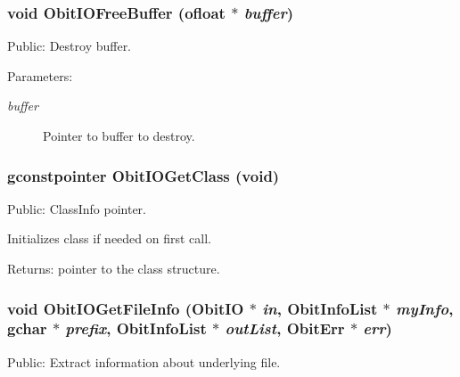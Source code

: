 \subsubsection{\setlength{\rightskip}{0pt plus 5cm}void Obit\-IOFree\-Buffer ({\bf ofloat} $\ast$ {\em buffer})}\label{ObitIO_8c_a29}


Public: Destroy buffer. 

\begin{Desc}
\item[Parameters:]
\begin{description}
\item[{\em buffer}]Pointer to buffer to destroy. \end{description}
\end{Desc}
\subsubsection{\setlength{\rightskip}{0pt plus 5cm}gconstpointer Obit\-IOGet\-Class (void)}\label{ObitIO_8c_a7}


Public: Class\-Info pointer. 

Initializes class if needed on first call. \begin{Desc}
\item[Returns:]pointer to the class structure. \end{Desc}
\subsubsection{\setlength{\rightskip}{0pt plus 5cm}void Obit\-IOGet\-File\-Info ({\bf Obit\-IO} $\ast$ {\em in}, {\bf Obit\-Info\-List} $\ast$ {\em my\-Info}, gchar $\ast$ {\em prefix}, {\bf Obit\-Info\-List} $\ast$ {\em out\-List}, {\bf Obit\-Err} $\ast$ {\em err})}\label{ObitIO_8c_a32}


Public: Extract information about underlying file. 

